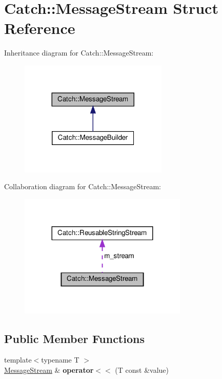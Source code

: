 \hypertarget{structCatch_1_1MessageStream}{}\section{Catch\+::Message\+Stream Struct Reference}
\label{structCatch_1_1MessageStream}


Inheritance diagram for Catch\+::Message\+Stream\+:\nopagebreak
\begin{figure}[H]
\begin{center}
\leavevmode
\includegraphics[width=200pt]{structCatch_1_1MessageStream__inherit__graph}
\end{center}
\end{figure}


Collaboration diagram for Catch\+::Message\+Stream\+:\nopagebreak
\begin{figure}[H]
\begin{center}
\leavevmode
\includegraphics[width=227pt]{structCatch_1_1MessageStream__coll__graph}
\end{center}
\end{figure}
\subsection*{Public Member Functions}
\begin{DoxyCompactItemize}
\item 
\mbox{\label{structCatch_1_1MessageStream_a554c4aff5925a077e9fe9d858217428d}} 
{\footnotesize template$<$typename T $>$ }\\\mbox{\hyperlink{structCatch_1_1MessageStream}{Message\+Stream}} \& {\bfseries operator$<$$<$} (T const \&value)
\end{DoxyCompactItemize}
